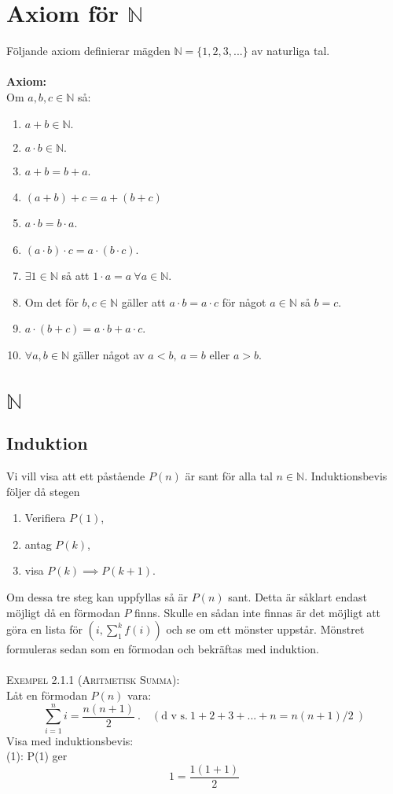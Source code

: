 \documentclass{article}
\begin{document}
\section{Axiom för $\mathbb{N}$}
Följande axiom definierar mägden $\mathbb{N}=\{1,2,3,...\}$ av naturliga tal.\\ \\
\textbf{Axiom:}\\ 
Om $a,b,c\in\mathbb{N}$ så:
\begin{enumerate}%
    \item $a+b\in\mathbb{N}.$ 
    \item $a\cdot b\in\mathbb{N}.$
    \item $a+b=b+a$.
    \item $(a+b)+c=a+(b+c)$
    \item $a\cdot b=b\cdot a$.
    \item $(a\cdot b)\cdot c=a\cdot(b \cdot c)$.
    \item $\exists 1\in\mathbb{N}$ så att $1\cdot a=a \ \forall a\in\mathbb{N}$.
    \item Om det för $b,c\in\mathbb{N}$ gäller att $a\cdot b=a\cdot c$ för något $a\in\mathbb{N}$ så $b=c$.
    \item $a\cdot(b+c)=a\cdot b+a\cdot c$.
    \item $\forall a,b\in
    \mathbb{N}$ gäller något av $a<b, \ a=b$ eller $a>b$.
\end{enumerate}
\newpage
\section{$\mathbb{N}$}
\subsection{Induktion}
Vi vill visa att ett påstående $P(n)$ är sant för alla tal $n\in\mathbb{N}$. Induktionsbevis följer då stegen
\begin{enumerate}%
    \item Verifiera $P(1)$,
    \item antag $P(k)$,
    \item visa $P(k)\implies P(k+1).$
\end{enumerate}
Om dessa tre steg kan uppfyllas så är $P(n)$ sant. Detta är såklart endast möjligt då en förmodan $P$ finns. Skulle en sådan inte finnas är det möjligt att göra en lista för $(i,\sum_1^k f(i))$ och se om ett mönster uppstår. Mönstret formuleras sedan som en förmodan och bekräftas med induktion.
\\ \\
\textsc{Exempel 2.1.1 (Aritmetisk Summa):}
\\Låt en förmodan $P(n)$ vara:
\begin{equation*}
    \sum_{i=1}^ni=\frac{n(n+1)}{2} \ . \quad (\textrm{d v s.} \  1+2+3+...+n=n(n+1)/2 \ )
\end{equation*}
Visa med induktionsbevis:
\\
(1): P(1) ger
\begin{equation*}
    1=\frac{1(1+1)}{2}
\end{equation*}
\end{document}
